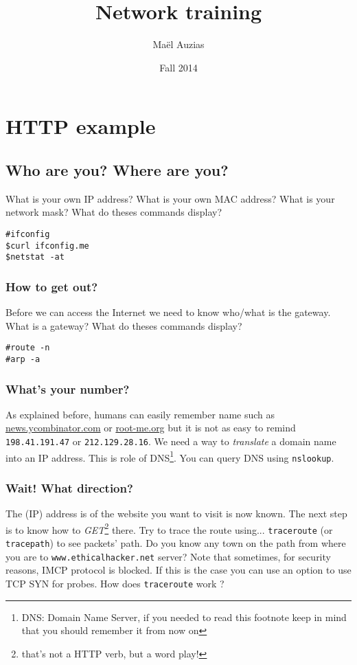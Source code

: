 \documentclass[11pt]{article}
\begin{document}
\title{Network training}
\date{Fall 2014}
\author{Maël Auzias}
\maketitle

\tableofcontents
\pagebreak


\section{HTTP example}
\subsection{Who are you? Where are you?}
What is your own IP address? What is your own MAC address? What is your network mask?
What do theses commands display?
\begin{verbatim}
#ifconfig
$curl ifconfig.me
$netstat -at
\end{verbatim}

\subsubsection{How to get out?}
Before we can access the Internet we need to know who/what is the gateway. What is a gateway?
What do theses commands display?
\begin{verbatim}
#route -n
#arp -a
\end{verbatim}

\subsubsection{What's your number?}
As explained before, humans can easily remember name such as \color{blue}\href{https://news.ycombinator.com}{news.ycombinator.com}\color{black} or \color{blue}\href{http://root-me.org}{root-me.org}\color{black} but it is not as easy to remind \verb"198.41.191.47" or \verb"212.129.28.16". We need a way to \emph{translate} a domain name into an IP address. This is role of DNS\footnote{DNS: Domain Name Server, if you needed to read this footnote keep in mind that you should remember it from now on}. You can query DNS using \verb"nslookup".

\subsubsection{Wait! What direction?}
The (IP) address is of the website you want to visit is now known. The next step is to know how to \emph{GET}\footnote{that's not a HTTP verb, but a word play!} there. Try to trace the route using... \verb"traceroute" (or \verb"tracepath") to see packets' path. Do you know any town on the path from where you are to \verb"www.ethicalhacker.net" server?
Note that sometimes, for security reasons, IMCP protocol is blocked. If this is the case you can use an option to use TCP SYN for probes.
How does \verb"traceroute" work ?
\end{document}
